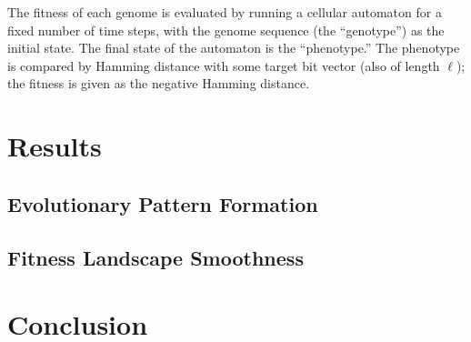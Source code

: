 \documentclass[twocolumn]{article}
\begin{document}
The fitness of each genome is evaluated by running a cellular automaton for a fixed number of time steps, with the genome sequence (the ``genotype'') as the initial state. The final state of the automaton is the ``phenotype.'' The phenotype is compared by Hamming distance with some target bit vector (also of length $\ell$); the fitness is given as the negative Hamming distance. 

\section{Results}

\subsection{Evolutionary Pattern Formation}

\subsection{Fitness Landscape Smoothness}

\section{Conclusion}
\end{document}
